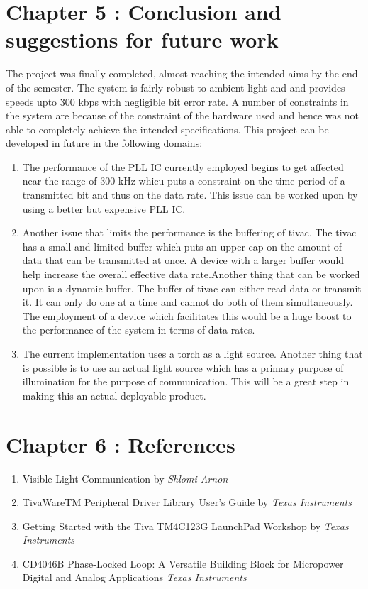 \documentclass{article}
\begin{document}
\section{Chapter 5 : Conclusion and suggestions for future work}

The project was finally completed, almost reaching the intended aims by the end of the semester. The system is fairly robust to ambient light and and provides speeds upto $300$ kbps with negligible bit error rate. A number of constraints in the system are because of the constraint of the hardware used and hence was not able to completely achieve the intended specifications. This project can be developed in future in the following domains:
\begin{enumerate}
\item The performance of the PLL IC currently employed begins to get affected near the range of $300$ kHz whicu puts a constraint on the time period of a transmitted bit and thus on the data rate. This issue can be worked upon by using a better but expensive PLL IC.
\item Another issue that limits the performance is the buffering of tivac. The tivac has a small and limited buffer which puts an upper cap on the amount of data that can be transmitted at once. A device with a larger buffer would help increase the overall effective data rate.Another thing that can be worked upon is a dynamic buffer. The buffer of tivac can either read data or transmit it. It can only do one at a time and cannot do both of them simultaneously. The employment of a device which facilitates this would be a huge boost to the performance of the system in terms of data rates.
\item The current implementation uses a torch as a light source. Another thing that is possible is to use an actual light source which has a primary purpose of illumination for the purpose of communication. This will be a great step in making this an actual deployable product. 
\end{enumerate}

\section{Chapter 6 : References}
\begin{enumerate}
\item Visible Light Communication by \textit{Shlomi Arnon}
\item TivaWareTM Peripheral Driver Library User's Guide by \textit{Texas Instruments}
\item Getting Started with the Tiva TM4C123G LaunchPad Workshop by \textit{Texas Instruments}
\item CD4046B Phase-Locked Loop: A Versatile Building Block for Micropower Digital and Analog Applications \textit{Texas Instruments}
\end{enumerate}
\end{document}
